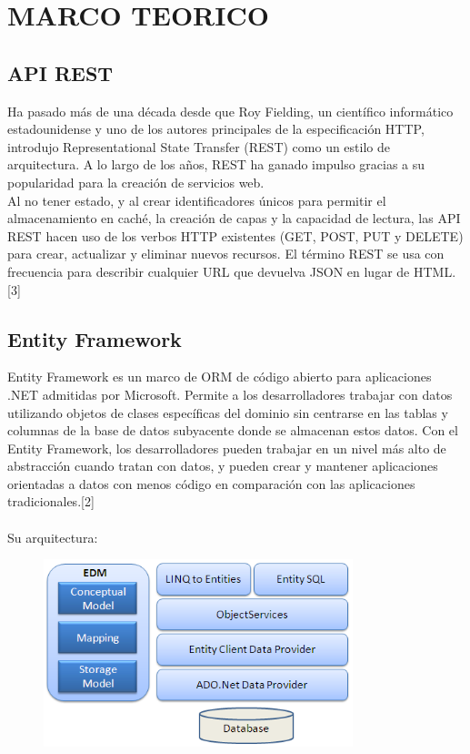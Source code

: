 \section{MARCO TEORICO} 

\par 

\subsection{API REST}
	\par Ha pasado más de una década desde que Roy Fielding, un científico informático estadounidense y uno de los autores principales de la especificación HTTP, introdujo Representational State Transfer (REST) como un estilo de arquitectura. A lo largo de los años, REST ha ganado impulso gracias a su popularidad para la creación de servicios web.\\
Al no tener estado, y al crear identificadores únicos para permitir el almacenamiento en caché, la creación de capas y la capacidad de lectura, las API REST hacen uso de los verbos HTTP existentes (GET, POST, PUT y DELETE) para crear, actualizar y eliminar nuevos recursos. El término REST se usa con frecuencia para describir cualquier URL que devuelva JSON en lugar de HTML.[3]
\subsection{Entity Framework}
	\par Entity Framework es un marco de ORM de código abierto para aplicaciones .NET admitidas por Microsoft. Permite a los desarrolladores trabajar con datos utilizando objetos de clases específicas del dominio sin centrarse en las tablas y columnas de la base de datos subyacente donde se almacenan estos datos. Con el Entity Framework, los desarrolladores pueden trabajar en un nivel más alto de abstracción cuando tratan con datos, y pueden crear y mantener aplicaciones orientadas a datos con menos código en comparación con las aplicaciones tradicionales.[2]\\
\\Su arquitectura:
\begin{figure}[H]
\begin{center}
\includegraphics[width=9cm]{./Imagenes/ef-architecture}
\end{center}
\end{figure}

